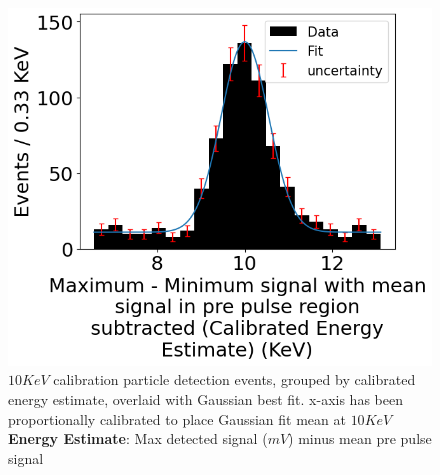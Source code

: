 \begin{figure}[H]
\begin{minipage}[t]{0.45\linewidth}
\begin{center}
			\includegraphics[width=\textwidth]{figures/amp2--calibrated.png}
			\caption{
                $10\unit{KeV}$ calibration particle detection events, grouped by calibrated energy estimate, overlaid with Gaussian best fit. x-axis has been proportionally calibrated to place Gaussian fit mean at $10\unit{KeV}$ \\
                \textbf{Energy Estimate}: Max detected signal ($\unit{mV}$) minus mean pre pulse signal
            }
		\end{center}
	\end{minipage}
\end{figure}
